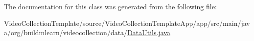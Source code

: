 The documentation for this class was generated from the following file\+:\begin{DoxyCompactItemize}
\item 
Video\+Collection\+Template/source/\+Video\+Collection\+Template\+App/app/src/main/java/org/buildmlearn/videocollection/data/\hyperlink{VideoCollectionTemplate_2source_2VideoCollectionTemplateApp_2app_2src_2main_2java_2org_2buildmle013b34ea684e2708e64b4b961571aa67}{Data\+Utils.\+java}\end{DoxyCompactItemize}
